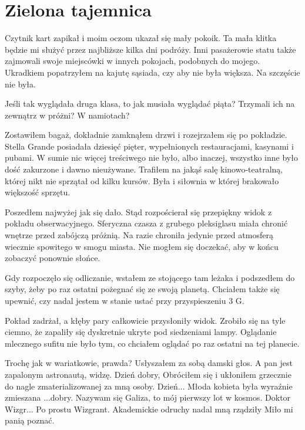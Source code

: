 \chapter{Zielona tajemnica} 


Czytnik kart zapikał i moim oczom ukazał się mały pokoik. 
Ta mała klitka będzie mi służyć przez najbliższe kilka dni podróży.
Inni pasażerowie statu także zajmowali swoje miejscówki w innych pokojach, podobnych do mojego.
Ukradkiem popatrzyłem na kajutę sąsiada, czy aby nie była większa. 
Na szczęście nie była.

Jeśli tak wyglądała druga klasa, to jak musiała wyglądać piąta? 
Trzymali ich na zewnątrz w próżni? W namiotach?

Zostawiłem bagaż, dokładnie zamknąłem drzwi i rozejrzałem się po pokładzie.
Stella Grande posiadała dziesięć pięter, wypełnionych restauracjami, kasynami i pubami.
W sumie nic więcej treściwego nie było, albo inaczej, wszystko inne było dość zakurzone i dawno nieużywane.
Trafiłem na jakąś salę kinowo-teatralną, której nikt nie sprzątał od kilku kursów.
Była i siłownia w której brakowało większość sprzętu.

Poszedłem najwyżej jak się dało.
Stąd rozpościerał się przepiękny widok z pokładu obserwacyjnego.
Sferyczna czasza z grubego pleksiglasu miała chronić wnętrze przed zabójczą próżnią.
Na razie chroniła jedynie przed atmosferą wiecznie spowitego w smogu miasta.
Nie mogłem się doczekać, aby w końcu zobaczyć ponownie słońce.

Gdy rozpoczęło się odliczanie, wstałem ze stojącego tam leżaka i podszedłem do szyby, żeby po raz ostatni pożegnać się ze swoją planetą.
Chciałem także się upewnić, czy nadal jestem w stanie ustać przy przyspieszeniu 3 G.

Pokład zadrżał, a kłęby pary całkowicie przysłoniły widok.
Zrobiło się na tyle ciemno, że zapaliły się dyskretnie ukryte pod siedzeniami lampy.
Oglądanie mlecznego sufitu nie było tym, co chciałem oglądać po raz ostatni na tej planecie.

\begin{dialogue}
	\ds{} Trochę jak w wariatkowie, prawda? \dm{} Usłyszałem za sobą damski głos. \dm{} A pan jest zapalonym astronautą, widzę.
	\ds{} Dzień dobry,  \dm{} Obróciłem się i ukłoniłem grzecznie do nagle zmaterializowanej za mną osoby.
	\ds{} Dzień... \dm{} Młoda kobieta była wyraźnie zmieszana \dm{} ...dobry. Nazywam się Galiza, to mój pierwszy lot w kosmos.
	\ds{} Doktor Wizgr... Po prostu Wizgrant. \dm{} Akademickie odruchy nadal mną rządziły \dm{} Miło mi panią poznać.
\end{dialogue}

